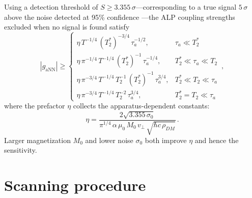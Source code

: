 Using a detection threshold of $S \geq 3.355\,\sigma$---corresponding to a true signal $5\,\sigma$ above the noise detected at 95\% confidence \cite{aybas2021_SolidStateNMR}---the ALP coupling strengths excluded when no signal is found satisfy
\begin{equation}
    |g_{\mathrm{aNN}}| \geqslant
    \left\{
    \begin{array}{cl}
    \eta\, T^{-1/4}\, (T_2^*)^{-3/4}\, \tau_a^{-1/2} ,
    & \tau_a\ll T_2^* \\[6pt]
    \eta\, \pi^{-1/4}\, T^{-1/4}\, (T_2^*)^{-1}\, \tau_a^{-1/4} ,
    &  T_2^*\ll\tau_a \ll T_2\\[6pt]
    \eta\, \pi^{-3/4}\, T^{-1/4}\, T_2^{-1}\, (T_2^*)^{-1}\, \tau_a^{3/4}  ,
    &  T_2^*\ll T_2\ll\tau_a \\[6pt]
    \eta\, \pi^{-3/4}\, T^{-1/4}\, T_2^{-2}\, \tau_a^{3/4}   ,
    &  T_2^*= T_2\ll\tau_a
    \end{array} \right.
    \,, \label{eq:exclusion_threshold}
\end{equation}
where the prefactor $\eta$ collects the apparatus-dependent constants:
\begin{equation}
    \eta = \dfrac{2\sqrt{3.355\,\sigma_0}}{\pi^{1/4}\,\alpha\,\mu_0\,M_0\,v_{\bot}\,\sqrt{\hbar c\,\rho_{DM}}}
    \,.\label{eq:eta}
\end{equation}
Larger magnetization $M_0$ and lower noise $\sigma_0$ both improve $\eta$ and hence the sensitivity.


\section{Scanning procedure}\label{sec:experiment:procedure}

